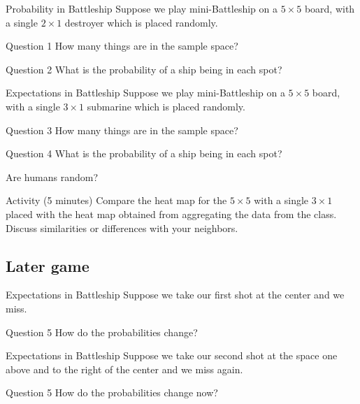 \documentclass{beamer}
\begin{document}
\begin{frame}{Probability in Battleship}
Suppose we play mini-Battleship on a $5\times 5$ board, with a single $2\times 1$ destroyer which is placed randomly.
\pause
\begin{block}{Question 1}
How many things are in the sample space?
\end{block}
\pause
\begin{block}{Question 2}
What is the probability of a ship being in each spot?
\end{block}
\end{frame}

\begin{frame}{Expectations in Battleship}
Suppose we play mini-Battleship on a $5\times 5$ board, with a single $3\times 1$ submarine which is placed randomly.
\pause
\begin{block}{Question 3}
How many things are in the sample space?
\end{block}
\pause
\begin{block}{Question 4}
What is the probability of a ship being in each spot?
\end{block}
\end{frame}

\begin{frame}{Are humans random?}
\begin{block}{Activity (5 minutes)}
Compare the heat map for the $5\times 5$ with a single $3\times 1$ placed with the heat map obtained from aggregating the data from the class.  Discuss similarities or differences with your neighbors.
\end{block}
\end{frame}

\subsection{Later game}

\begin{frame}{Expectations in Battleship}
Suppose we take our first shot at the center and we miss.
\pause
\begin{block}{Question 5}
How do the probabilities change?
\end{block}
\end{frame}

\begin{frame}{Expectations in Battleship}
Suppose we take our second shot at the space one above and to the right of the center and we miss again.
\pause
\begin{block}{Question 5}
How do the probabilities change now?
\end{block}
\end{frame}
\end{document}
